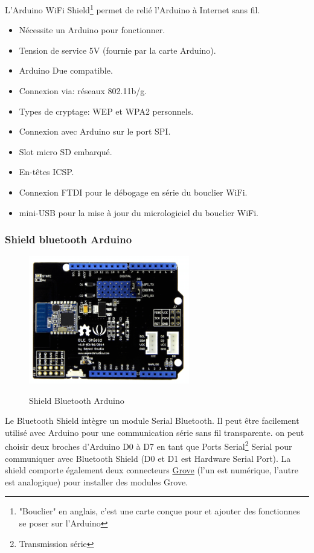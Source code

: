 L'Arduino WiFi Shield\footnote{"Bouclier" en anglais, c'est une carte conçue pour et ajouter des fonctionnes se poser sur l'Arduino} permet de relié l'Arduino à Internet sans fil.

\begin{itemize}
\item Nécessite un Arduino pour fonctionner.
\item Tension de service 5V (fournie par la carte Arduino). 
\item Arduino Due compatible.
\item Connexion via: réseaux 802.11b/g.
\item Types de cryptage: WEP et WPA2 personnels.
\item Connexion avec Arduino sur le port SPI.
\item Slot micro SD embarqué.
\item En-têtes ICSP.
\item Connexion FTDI pour le débogage en série du bouclier WiFi.
\item mini-USB pour la mise à jour du micrologiciel du bouclier WiFi.
\end{itemize}




\subsubsection{Shield bluetooth Arduino}

\begin{figure}[H]
  \centering
  \href{https://www.seeedstudio.com/Seeed-BLE-Shield-p-1859.html}{
  \includegraphics[width=7cm]{image/arduino_ble.png}
  }
  \caption{Shield Bluetooth Arduino}
\end{figure}

Le Bluetooth Shield intègre un module Serial Bluetooth. Il peut être facilement utilisé avec Arduino pour une communication série sans fil transparente. on peut  choisir deux broches d'Arduino D0 à D7 en tant que Ports Serial\footnote{ Transmission série} Serial pour communiquer avec Bluetooth Shield (D0 et D1 est Hardware Serial Port). La shield comporte également deux connecteurs \href{https://www.seeedstudio.com/Grove-Universal-4-pin-connector-p-789.html}{Grove}  (l'un est numérique, l'autre est analogique) pour installer des modules Grove.



